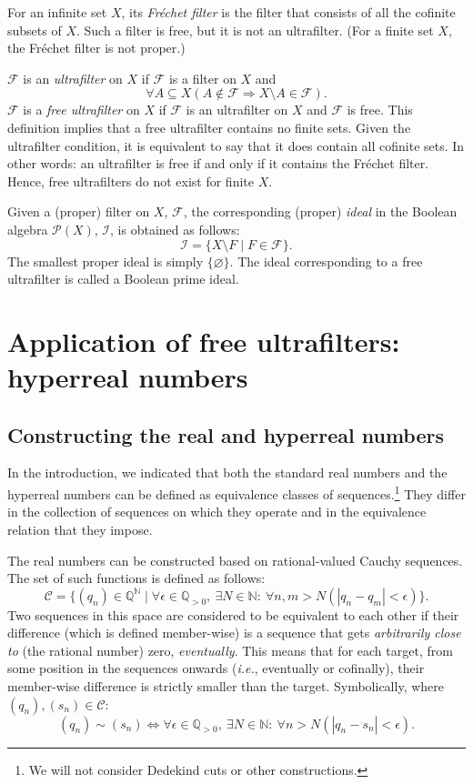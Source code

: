 For an infinite set $X$, its \textit{Fr\'{e}chet filter} is the filter that consists of all the cofinite subsets of $X$. Such a filter is free, but it is not an ultrafilter. (For a finite set $X$, the Fr\'{e}chet filter is not proper.)

$\mathcal{F}$ is an \textit{ultrafilter} on $X$ if $\mathcal{F}$ is a filter on $X$ and
$$\forall A \subseteq X (A \notin \mathcal{F} \Rightarrow X \setminus A \in \mathcal{F}).$$
$\mathcal{F}$ is a \textit{free ultrafilter} on $X$ if $\mathcal{F}$ is an ultrafilter on $X$ and $\mathcal{F}$ is free. This definition implies that a free ultrafilter contains no finite sets. Given the ultrafilter condition, it is equivalent to say that it does contain all cofinite sets. In other words: an ultrafilter is free if and only if it contains the Fr\'{e}chet filter.
Hence, free ultrafilters do not exist for finite $X$.

Given a (proper) filter on $X$, $\mathcal{F}$, the corresponding (proper) \textit{ideal} in the Boolean algebra $\mathcal{P}(X)$, $\mathcal{I}$, is obtained as follows:
$$\mathcal{I} = \{ X \setminus F \mid F \in \mathcal{F} \}.$$
The smallest proper ideal is simply $\{ \varnothing \}$. The ideal corresponding to a free ultrafilter is called a Boolean prime ideal.

\section{Application of free ultrafilters: hyperreal numbers}\label{sec:hyperreal}
\subsection{Constructing the real and hyperreal numbers}
In the introduction, we indicated that both the standard real numbers and the hyperreal numbers can be defined as equivalence classes of sequences.\footnote{We will not consider Dedekind cuts or other constructions.} They differ in the collection of sequences on which they operate and in the equivalence relation that they impose.

The real numbers can be constructed based on rational-valued Cauchy sequences. The set of such functions is defined as follows:
$$\mathcal{C} = \{ (q_n) \in \mathbb{Q}^\mathbb{N} \mid \forall \epsilon \in \mathbb{Q}_{> 0}, \ \exists N \in \mathbb{N}: \ \forall n,m > N \left( |q_n - q_m| < \epsilon \right) \} .$$
Two sequences in this space are considered to be equivalent to each other if their difference (which is defined member-wise) is a sequence that gets \textit{arbitrarily close to} (the rational number) zero, \textit{eventually}. This means that for each target, from some position in the sequences onwards (\textit{i.e.}, eventually or cofinally), their  member-wise difference is strictly smaller than the target. Symbolically, where $(q_n), (s_n) \in \mathcal{C}$:
$$(q_n) \sim (s_n) \Leftrightarrow \forall \epsilon \in \mathbb{Q}_{> 0}, \ \exists N \in \mathbb{N}: \ \forall n > N \left( |q_n - s_n| < \epsilon \right).$$

